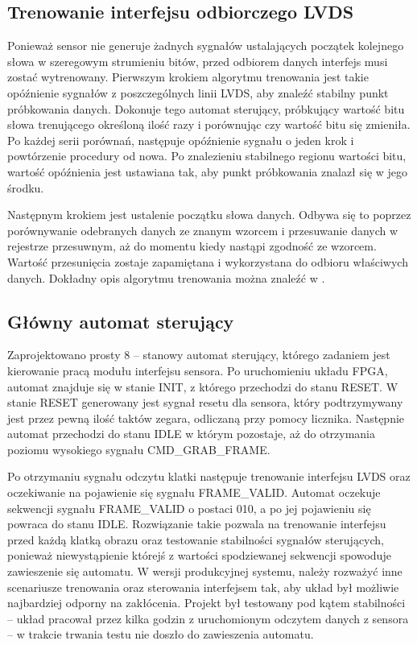 \documentclass[a4paper,11pt,oneside]{book}  %
\begin{document}
\subsection{Trenowanie interfejsu odbiorczego LVDS}
Ponieważ sensor nie generuje żadnych sygnałów ustalających początek kolejnego słowa w szeregowym strumieniu bitów, przed odbiorem danych interfejs musi zostać wytrenowany. Pierwszym krokiem algorytmu trenowania jest takie opóźnienie sygnałów z poszczególnych linii LVDS, aby znaleźć stabilny punkt próbkowania danych. Dokonuje tego automat sterujący, próbkujący wartość bitu słowa trenującego określoną ilość razy i porównując czy wartość bitu się zmieniła. Po każdej serii porównań, następuje opóźnienie sygnału o jeden krok i powtórzenie procedury od nowa. Po znalezieniu stabilnego regionu wartości bitu, wartość opóźnienia jest ustawiana tak, aby punkt próbkowania znalazł się w jego środku. 

Następnym krokiem jest ustalenie początku słowa danych. Odbywa się to poprzez porównywanie odebranych danych ze znanym wzorcem i przesuwanie danych w rejestrze przesuwnym, aż do momentu kiedy nastąpi zgodność ze wzorcem. Wartość przesunięcia zostaje zapamiętana i wykorzystana do odbioru właściwych danych. Dokładny opis algorytmu trenowania można znaleźć w \cite{12}.

\subsection{Główny automat sterujący}


Zaprojektowano prosty 8 – stanowy automat sterujący, którego zadaniem jest kierowanie pracą modułu interfejsu sensora. Po uruchomieniu układu FPGA, automat znajduje się w stanie INIT, z którego przechodzi do stanu RESET. W stanie RESET generowany jest sygnał resetu dla sensora, który podtrzymywany jest przez pewną ilość taktów zegara, odliczaną przy pomocy licznika. Następnie automat przechodzi do stanu IDLE w którym pozostaje, aż do otrzymania poziomu wysokiego sygnału CMD\_GRAB\_FRAME. 

Po otrzymaniu sygnału odczytu klatki następuje trenowanie interfejsu LVDS oraz oczekiwanie na pojawienie się sygnału FRAME\_VALID. Automat oczekuje sekwencji sygnału FRAME\_VALID o postaci 010, a po jej pojawieniu się powraca do stanu IDLE. Rozwiązanie takie pozwala na trenowanie interfejsu przed każdą klatką obrazu oraz testowanie stabilności sygnałów sterujących, ponieważ niewystąpienie którejś z wartości spodziewanej sekwencji spowoduje zawieszenie się automatu. W wersji produkcyjnej systemu, należy rozważyć inne scenariusze trenowania oraz sterowania interfejsem tak, aby układ był możliwie najbardziej odporny na zakłócenia. Projekt był testowany pod kątem stabilności – układ pracował przez kilka godzin z uruchomionym odczytem danych z sensora – w trakcie trwania testu nie doszło do zawieszenia automatu.
\end{document}
